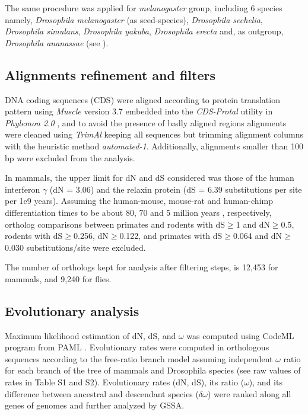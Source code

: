 The same procedure was applied for \textit{melanogaster} group, including 6 species namely, \textit{Drosophila melanogaster} (as \gls{seed}-species), \textit{Drosophila sechelia}, \textit{Drosophila simulans}, \textit{Drosophila yakuba}, \textit{Drosophila erecta} and, as outgroup, \textit{Drosophila ananassae} (see ).

\subsection{Alignments refinement and filters}
DNA coding sequences (CDS) were aligned according to protein translation pattern using \textit{Muscle} version 3.7 \cite{Edgar2004} embedded into the \textit{CDS-Protal} utility in \textit{Phylemon 2.0} \cite{Sanchez2011}, and to avoid the presence of badly aligned regions alignments were cleaned using \textit{TrimAl} \cite{Capella-Gutierrez2009} keeping all sequences but trimming alignment columns with the heuristic method \textit{automated-1}. Additionally, alignments smaller than 100 bp were excluded from the analysis. 

In mammals, the upper limit for dN and dS considered was those of the human interferon $\gamma$ (dN = 3.06) and the relaxin protein \cite{Graur2000} (dS = 6.39 substitutions per site per 1e9 years). Assuming the human-mouse, mouse-rat and human-chimp differentiation times to be about 80, 70 and 5 million years \cite{BlairHedges2003}, respectively, ortholog comparisons between primates and rodents with dS$\ge$1 and dN$\ge$0.5, rodents with dS$\ge$0.256, dN$\ge$0.122, and primates with dS$\ge$0.064 and dN$\ge$0.030 substitutions/site were excluded.

The number of orthologs kept for analysis after filtering steps, is 12,453 for mammals, and 9,240 for flies.

\subsection{Evolutionary analysis}

Maximum likelihood estimation of dN, dS, and $\omega$ was computed using CodeML program from PAML \cite{Yang2007}. Evolutionary rates were computed in orthologous sequences according to the free-ratio branch model assuming independent $\omega$ ratio for each branch of the tree of mammals and Drosophila species (see raw values of rates in Table S1 and S2). Evolutionary rates (dN, dS), its ratio ($\omega$), and its difference between ancestral and descendant species ($\delta\omega$) were ranked along all genes of genomes and further analyzed by GSSA.

